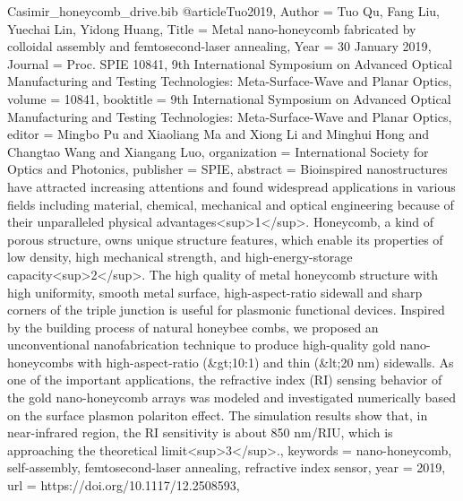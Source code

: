 \documentclass[twoside, 10pt]{article}
\def\myfilename{Casimir_honeycomb_drive}
\begin{document}
\begin{multicols}{2}
\begin{filecontents}{\myfilename.bib}
@article{Tuo2019,
    Author = {Tuo Qu, Fang Liu, Yuechai Lin, Yidong Huang},
    Title = {Metal nano-honeycomb fabricated by colloidal assembly and femtosecond-laser annealing},
    Year = {30 January 2019},
    Journal = {Proc. SPIE 10841, 9th International Symposium on Advanced Optical Manufacturing and Testing Technologies: Meta-Surface-Wave and Planar Optics},
    volume = {10841},
    booktitle = {9th International Symposium on Advanced Optical Manufacturing and Testing Technologies: Meta-Surface-Wave and Planar Optics},
    editor = {Mingbo Pu and Xiaoliang Ma and Xiong Li and Minghui Hong and Changtao Wang and Xiangang Luo},
    organization = {International Society for Optics and Photonics},
    publisher = {SPIE},
    abstract = {Bioinspired nanostructures have attracted increasing attentions and found widespread applications in various fields including material, chemical, mechanical and optical engineering because of their unparalleled physical advantages<sup>1</sup>. Honeycomb, a kind of porous structure, owns unique structure features, which enable its properties of low density, high mechanical strength, and high-energy-storage capacity<sup>2</sup>. The high quality of metal honeycomb structure with high uniformity, smooth metal surface, high-aspect-ratio sidewall and sharp corners of the triple junction is useful for plasmonic functional devices. Inspired by the building process of natural honeybee combs, we proposed an unconventional nanofabrication technique to produce high-quality gold nano-honeycombs with high-aspect-ratio (&gt;10:1) and thin (&lt;20 nm) sidewalls. As one of the important applications, the refractive index (RI) sensing behavior of the gold nano-honeycomb arrays was modeled and investigated numerically based on the surface plasmon polariton effect. The simulation results show that, in near-infrared region, the RI sensitivity is about 850 nm/RIU, which is approaching the theoretical limit<sup>3</sup>.},
    keywords = {nano-honeycomb, self-assembly, femtosecond-laser annealing, refractive index sensor},
    year = {2019},
    url = {https://doi.org/10.1117/12.2508593},
}



\end{filecontents}
\end{multicols}
\end{document}
